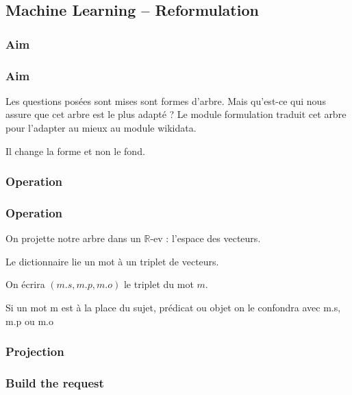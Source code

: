 \subsection{Machine Learning \--- Reformulation}

\subsubsection{Aim}

\begin{frame}
\frametitle{Aim}
Les questions posées sont mises sont formes d'arbre. Mais qu'est-ce qui nous assure que cet arbre est le plus adapté ?
\pause
Le module formulation traduit cet arbre pour l'adapter au mieux au module wikidata.

Il change la forme et non le fond.
\end{frame}

\subsubsection{Operation}
\begin{frame}
\frametitle{Operation}
On projette notre arbre dans un $\mathbb{R}$-ev : l'espace des vecteurs.

\begin{defi}
Le dictionnaire lie un mot à un triplet de vecteurs.

On écrira $(m.s,m.p,m.o)$ le triplet du mot $m$.
\end{defi}

Si un mot m est à la place du sujet, prédicat ou objet on le confondra avec m.s, m.p ou m.o

\end{frame}

\begin{frame}
\frametitle{Projection}
\end{frame}

\subsubsection{Build the request}

